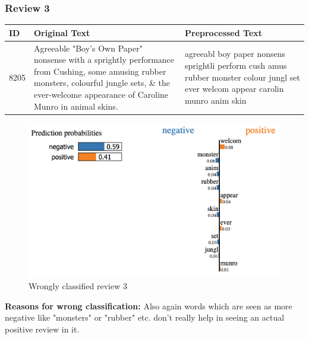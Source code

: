 \newpage
\subsubsection{Review 3}

\begin{tabularx}{\textwidth}{l|X|X}
\textbf{ID} & \textbf{Original Text} & \textbf{Preprocessed Text}\\
\hline
8205 & 
Agreeable "Boy's Own Paper" nonsense with a sprightly performance from Cushing, some amusing rubber monsters, colourful jungle sets, \& the ever-welcome appearance of Caroline Munro in animal skins.
&
agreeabl boy paper nonsens sprightli perform cush amus rubber monster colour jungl set ever welcom appear carolin munro anim skin
\end{tabularx}

\begin{figure}[htb!]
	\includegraphics[width=\textwidth]{img/review_3}
	\caption{Wrongly classified review 3}
\end{figure}

\textbf{Reasons for wrong classification:}
Also again words which are seen as more negative like "monsters" or "rubber" etc. don't really help in seeing an actual positive review in it.